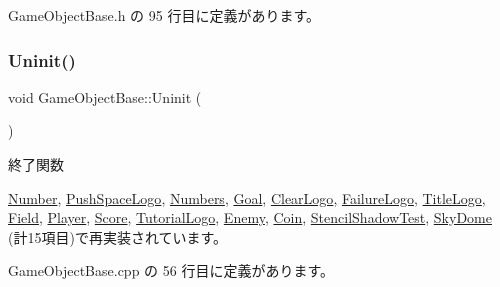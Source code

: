  Game\+Object\+Base.\+h の 95 行目に定義があります。

\mbox{\label{class_game_object_base_a97e1bc277d7b1c0156d4735de29a022c}} 
\subsubsection{\texorpdfstring{Uninit()}{Uninit()}}
{\footnotesize\ttfamily void Game\+Object\+Base\+::\+Uninit (\begin{DoxyParamCaption}{ }\end{DoxyParamCaption})\hspace{0.3cm}{\ttfamily [virtual]}}



終了関数 



\mbox{\hyperlink{class_number_a7c3bf9c55f7a0a19d80129c5f07f99f2}{Number}}, \mbox{\hyperlink{class_push_space_logo_a06404113db417c58941ca7a13bba161e}{Push\+Space\+Logo}}, \mbox{\hyperlink{class_numbers_aeaad3cc1b8ae7defe79813b983b04101}{Numbers}}, \mbox{\hyperlink{class_goal_a48126385a674bcda855e2a61561fbf9f}{Goal}}, \mbox{\hyperlink{class_clear_logo_ab55def116615b92a8e8cc40b364b7a4c}{Clear\+Logo}}, \mbox{\hyperlink{class_failure_logo_adbe01fc4567ade0e788f511f5162299c}{Failure\+Logo}}, \mbox{\hyperlink{class_title_logo_a177943b3becc80fcdb7a34f131b07ee9}{Title\+Logo}}, \mbox{\hyperlink{class_field_a6d1015e2409daa87cd00485ac1efc06b}{Field}}, \mbox{\hyperlink{class_player_a7455a83ac23d2f5e0cce0ddd7d92db0c}{Player}}, \mbox{\hyperlink{class_score_a605e163dc59ccc4d19a3cb6b5db813b8}{Score}}, \mbox{\hyperlink{class_tutorial_logo_a8e1f1dba47dadf7d1bb40f616324ffb5}{Tutorial\+Logo}}, \mbox{\hyperlink{class_enemy_a9aeaa757abdf0c37fd67c4ce5aed6962}{Enemy}}, \mbox{\hyperlink{class_coin_a4d364dcb4b57b80ea00ce931d0bb300f}{Coin}}, \mbox{\hyperlink{class_stencil_shadow_test_a51b5d75aaba5673a13f950bd6b742720}{Stencil\+Shadow\+Test}}, \mbox{\hyperlink{class_sky_dome_a7fc71bfa671cf6e7ab26a194459b0753}{Sky\+Dome}} (計15項目)で再実装されています。



 Game\+Object\+Base.\+cpp の 56 行目に定義があります。

\mbox{\label{class_game_object_base_aff8e4f486435f5d921c186b0824e8a0e}} 
